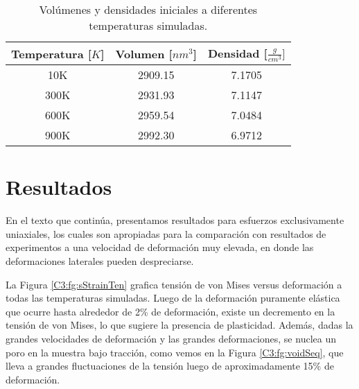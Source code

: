 
\begin{table}[htp]
\caption[Volúmenes y densidades iniciales.]{Volúmenes y densidades iniciales a diferentes temperaturas simuladas.}
\begin{center}
\begin{tabular}{*{3}{c}}
\hline
Temperatura [$K$] & Volumen [$nm^{3}$] & Densidad [$\frac{g}{cm^{3}}]$ \\ \hline \hline
10K & 2909.15 & 7.1705 \\ \hline
300K & 2931.93 & 7.1147 \\ \hline
600K & 2959.54 & 7.0484 \\ \hline
900K & 2992.30 & 6.9712 \\ \hline
\end{tabular}
\end{center}
\label{C3:tb:initprops}
\end{table}

\section{Resultados}
\label{S3_3}

En el texto que continúa, presentamos resultados para esfuerzos exclusivamente uniaxiales, los cuales son apropiadas para la comparación con resultados de experimentos a una velocidad de deformación muy elevada, en donde las deformaciones laterales pueden despreciarse. 

La Figura \ref{C3:fg:sStrainTen} grafica tensión de von Mises versus deformación a todas las temperaturas simuladas. Luego de la deformación puramente elástica que ocurre hasta alrededor de 2\% de deformación, existe un decremento en la tensión de von Mises, lo que sugiere la presencia de plasticidad. Además, dadas la grandes velocidades de deformación y las grandes deformaciones, se nuclea un poro en la muestra bajo tracción, como vemos en la Figura \ref{C3:fg:voidSeq}, que lleva a grandes fluctuaciones de la tensión luego de aproximadamente 15\% de deformación.

